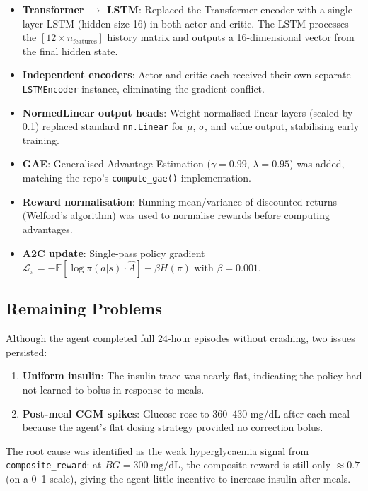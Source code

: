 \documentclass[11pt,a4paper]{article}
\begin{document}
\begin{itemize}
    \item \textbf{Transformer $\to$ LSTM}: Replaced the Transformer encoder with a single-layer
          LSTM (hidden size 16) in both actor and critic. The LSTM processes the
          $[12 \times n_\text{features}]$ history matrix and outputs a 16-dimensional vector
          from the final hidden state.
    \item \textbf{Independent encoders}: Actor and critic each received their own separate
          \texttt{LSTMEncoder} instance, eliminating the gradient conflict.
    \item \textbf{NormedLinear output heads}: Weight-normalised linear layers (scaled by 0.1)
          replaced standard \texttt{nn.Linear} for $\mu$, $\sigma$, and value output,
          stabilising early training.
    \item \textbf{GAE}: Generalised Advantage Estimation ($\gamma = 0.99$, $\lambda = 0.95$)
          was added, matching the repo's \texttt{compute\_gae()} implementation.
    \item \textbf{Reward normalisation}: Running mean/variance of discounted returns
          (Welford's algorithm) was used to normalise rewards before computing advantages.
    \item \textbf{A2C update}: Single-pass policy gradient
          $\mathcal{L}_\pi = -\mathbb{E}[\log\pi(a|s) \cdot \hat{A}] - \beta H(\pi)$
          with $\beta = 0.001$.
\end{itemize}

\subsection{Remaining Problems}
Although the agent completed full 24-hour episodes without crashing, two issues persisted:
\begin{enumerate}
    \item \textbf{Uniform insulin}: The insulin trace was nearly flat, indicating the policy
          had not learned to bolus in response to meals.
    \item \textbf{Post-meal CGM spikes}: Glucose rose to 360--430 mg/dL after each meal
          because the agent's flat dosing strategy provided no correction bolus.
\end{enumerate}

The root cause was identified as the weak hyperglycaemia signal from \texttt{composite\_reward}:
at $BG = 300\ \text{mg/dL}$, the composite reward is still only $\approx 0.7$ (on a 0--1 scale),
giving the agent little incentive to increase insulin after meals.
\end{document}
